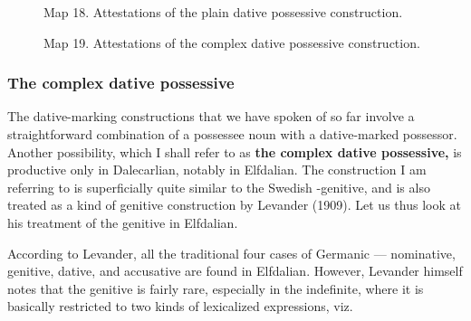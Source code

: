 \begin{figure}[h]
\centering
\begin{minipage}{4.23958in}
\label{bkm:Ref154557005}Map 18. Attestations of the plain dative possessive construction.
\end{minipage}
\end{figure}
\clearpage%



\begin{figure}[h]
\centering
\begin{minipage}{3.9625in}
Map 19. Attestations of the complex dative possessive construction.
\end{minipage}
\end{figure}
\clearpage\subsubsection[The complex dative possessive]{\rmfamily The complex dative possessive}
\label{bkm:Ref224373337}%
The dative-marking constructions that we have spoken of so far involve a straightforward combination of a possessee noun with a dative-marked possessor. Another possibility, which I shall refer to as \textbf{the complex dative possessive,} is productive only in Dalecarlian, notably in Elfdalian. The construction I am referring to is superficially quite similar to the Swedish -genitive, and is also treated as a kind of genitive construction by Levander (1909). Let us thus look at his treatment of the genitive in Elfdalian.

According to Levander, all the traditional four cases of Germanic — nominative, genitive, dative, and accusative are found in Elfdalian. However, Levander himself notes that the genitive is fairly rare, especially in the indefinite, where it is basically restricted to two kinds of lexicalized expressions, viz. 

